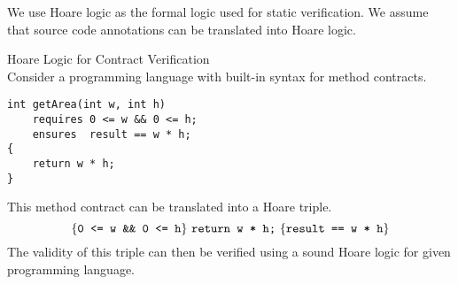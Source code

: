 We use Hoare logic \cite{hoare1969axiomatic} as the formal logic used for static verification.
We assume that source code annotations can be translated into Hoare logic.

\begin{example}{Hoare Logic for Contract Verification}~\\
    Consider a programming language with built-in syntax for method contracts.
    \begin{lstlisting}
int getArea(int w, int h)
    requires 0 <= w && 0 <= h;
    ensures  result == w * h;
{
    return w * h;
}
    \end{lstlisting}
    This method contract can be translated into a Hoare triple.
    \begin{displaymath}
    \{{\textup{\texttt{0 <= w \&\& 0 <= h}}}\} ~{\textup{\texttt{return w * h;}}}~ \{{\textup{\texttt{result == w * h}}}\}
    \end{displaymath}
    The validity of this triple can then be verified using a sound Hoare logic for given programming language.
\end{example}
